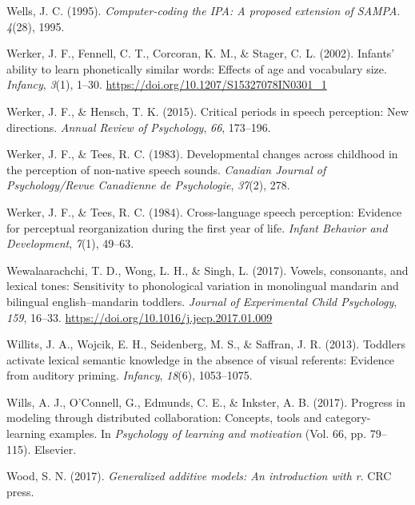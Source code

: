 \documentclass[
  12pt,
  b5paperpaper,
  twoside]{scrreprt}
\newlength{\cslhangindent}
\newlength{\cslentryspacingunit} %
\newenvironment{CSLReferences}[2] %
 {%
  \setlength{\parindent}{0pt}
  \ifodd #1
  \let\oldpar\par
  \def\par{\hangindent=\cslhangindent\oldpar}
  \fi
  \setlength{\parskip}{#2\cslentryspacingunit}
 }%
 {}
\begin{document}
\begin{CSLReferences}{1}{0}
\leavevmode{}%
Wells, J. C. (1995). \emph{Computer-coding the {IPA}: A proposed
extension of {SAMPA}}. \emph{4}(28), 1995.

\leavevmode{}%
Werker, J. F., Fennell, C. T., Corcoran, K. M., \& Stager, C. L. (2002).
Infants' ability to learn phonetically similar words: Effects of age and
vocabulary size. \emph{Infancy}, \emph{3}(1), 1--30.
\url{https://doi.org/10.1207/S15327078IN0301_1}

\leavevmode{}%
Werker, J. F., \& Hensch, T. K. (2015). Critical periods in speech
perception: New directions. \emph{Annual Review of Psychology},
\emph{66}, 173--196.

\leavevmode{}%
Werker, J. F., \& Tees, R. C. (1983). Developmental changes across
childhood in the perception of non-native speech sounds. \emph{Canadian
Journal of Psychology/Revue Canadienne de Psychologie}, \emph{37}(2),
278.

\leavevmode{}%
Werker, J. F., \& Tees, R. C. (1984). Cross-language speech perception:
Evidence for perceptual reorganization during the first year of life.
\emph{Infant Behavior and Development}, \emph{7}(1), 49--63.

\leavevmode{}%
Wewalaarachchi, T. D., Wong, L. H., \& Singh, L. (2017). Vowels,
consonants, and lexical tones: Sensitivity to phonological variation in
monolingual mandarin and bilingual english--mandarin toddlers.
\emph{Journal of Experimental Child Psychology}, \emph{159}, 16--33.
\url{https://doi.org/10.1016/j.jecp.2017.01.009}

\leavevmode{}%
Willits, J. A., Wojcik, E. H., Seidenberg, M. S., \& Saffran, J. R.
(2013). Toddlers activate lexical semantic knowledge in the absence of
visual referents: Evidence from auditory priming. \emph{Infancy},
\emph{18}(6), 1053--1075.

\leavevmode{}%
Wills, A. J., O'Connell, G., Edmunds, C. E., \& Inkster, A. B. (2017).
Progress in modeling through distributed collaboration: Concepts, tools
and category-learning examples. In \emph{Psychology of learning and
motivation} (Vol. 66, pp. 79--115). Elsevier.

\leavevmode{}%
Wood, S. N. (2017). \emph{Generalized additive models: An introduction
with r}. CRC press.


\end{CSLReferences}
\end{document}

